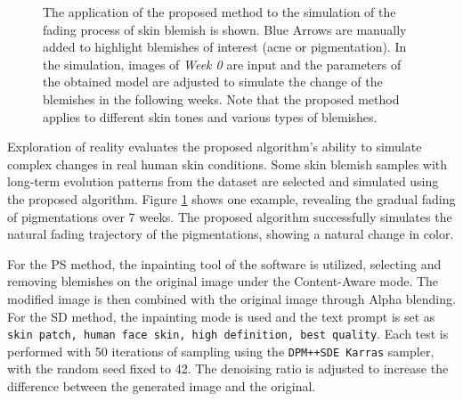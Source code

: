 \begin{spacing}{1.5}
\begin{figure}[t!]
    \caption{The application of the proposed method to the simulation of the fading process of skin blemish is shown. Blue Arrows are manually added to highlight blemishes of interest (acne or pigmentation). In the simulation, images of \textit{Week 0} are input and the parameters of the obtained model are adjusted to simulate the change of the blemishes in the following weeks. Note that the proposed method applies to different skin tones and various types of blemishes.}
    \label{fig:forward}
\end{figure}
Exploration of reality evaluates the proposed algorithm's ability to simulate complex changes in real human skin conditions. Some skin blemish samples with long-term evolution patterns from the dataset are selected and simulated using the proposed algorithm. Figure \ref{fig:forward} shows one example, revealing the gradual fading of pigmentations over 7 weeks. The proposed algorithm successfully simulates the natural fading trajectory of the pigmentations, showing a natural change in color.

For the PS method, the inpainting tool of the software is utilized, selecting and removing blemishes on the original image under the Content-Aware mode. The modified image is then combined with the original image through Alpha blending. For the SD method, the inpainting mode is used and the text prompt is set as \texttt{skin patch, human face skin, high definition, best quality}. Each test is performed with 50 iterations of sampling using the \texttt{DPM++SDE Karras} sampler, with the random seed fixed to 42. The denoising ratio is adjusted to increase the difference between the generated image and the original.


\end{spacing}
